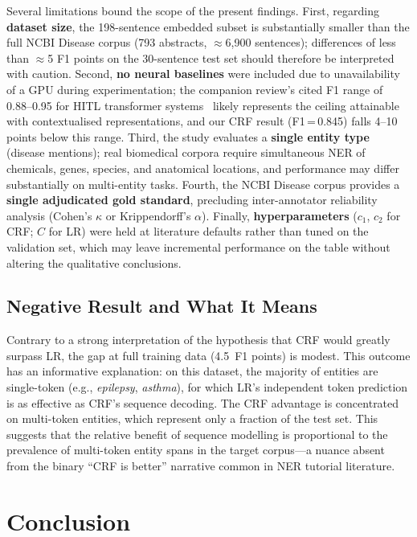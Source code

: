 \documentclass[sigconf,nonacm]{acmart}
\begin{document}
Several limitations bound the scope of the present findings. First, regarding \textbf{dataset size}, the 198-sentence embedded subset is substantially smaller than the full NCBI Disease corpus (793 abstracts, $\approx$6,900 sentences); differences of less than $\approx$5 F1 points on the 30-sentence test set should therefore be interpreted with caution. Second, \textbf{no neural baselines} were included due to unavailability of a GPU during experimentation; the companion review's cited F1 range of 0.88--0.95 for HITL transformer systems~\cite{hu2024} likely represents the ceiling attainable with contextualised representations, and our CRF result (F1\,=\,0.845) falls 4--10 points below this range. Third, the study evaluates a \textbf{single entity type} (disease mentions); real biomedical corpora require simultaneous NER of chemicals, genes, species, and anatomical locations, and performance may differ substantially on multi-entity tasks. Fourth, the NCBI Disease corpus provides a \textbf{single adjudicated gold standard}, precluding inter-annotator reliability analysis (Cohen's $\kappa$ or Krippendorff's $\alpha$). Finally, \textbf{hyperparameters} ($c_1$, $c_2$ for CRF; $C$ for LR) were held at literature defaults rather than tuned on the validation set, which may leave incremental performance on the table without altering the qualitative conclusions.

\subsection{Negative Result and What It Means}

Contrary to a strong interpretation of the hypothesis that CRF would greatly surpass LR, the gap at full training data (4.5~F1 points) is modest. This outcome has an informative explanation: on this dataset, the majority of entities are single-token (e.g., \emph{epilepsy}, \emph{asthma}), for which LR's independent token prediction is as effective as CRF's sequence decoding. The CRF advantage is concentrated on multi-token entities, which represent only a fraction of the test set. This suggests that the relative benefit of sequence modelling is proportional to the prevalence of multi-token entity spans in the target corpus---a nuance absent from the binary ``CRF is better'' narrative common in NER tutorial literature.

\section{Conclusion}
\end{document}
